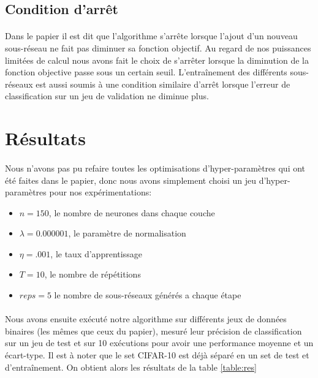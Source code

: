 \documentclass[11 pt]{article}
\begin{document}
\subsection{Condition d’arrêt}
\paragraph{}Dans le papier il est dit que l'algorithme s’arrête lorsque l'ajout d'un nouveau sous-réseau ne fait pas diminuer sa fonction objectif. Au regard de nos puissances limitées de calcul nous avons fait le choix de s’arrêter lorsque la diminution de la fonction objective passe sous un certain seuil. L’entraînement des différents sous-réseaux est aussi soumis à une condition similaire d’arrêt lorsque l'erreur de classification sur un jeu de validation ne diminue plus.

\section{Résultats}
\paragraph{}Nous n'avons pas pu refaire toutes les optimisations d'hyper-paramètres qui ont été faites dans le papier, donc nous avons simplement choisi un jeu d'hyper-paramètres pour nos expérimentations:
\begin{itemize}
  \item $n = 150$, le nombre de neurones dans chaque couche
  \item $\lambda = 0.000001$, le paramètre de normalisation
  \item $\eta = .001$, le taux d'apprentissage
  \item $T = 10$, le nombre de répétitions
  \item $reps = 5$ le nombre de sous-réseaux générés a chaque étape
\end{itemize}
\paragraph{}Nous avons ensuite exécuté notre algorithme sur différents jeux de données binaires (les mêmes que ceux du papier), mesur\'e leur précision de classification sur un jeu de test et sur 10 exécutions pour avoir une performance moyenne et un écart-type. Il est à noter que le set CIFAR-10 est déjà séparé en un set de test et d'entraînement. On obtient alors les résultats de la table \ref{table:res}
\end{document}
